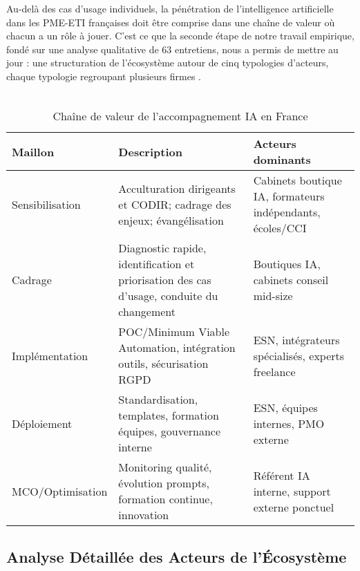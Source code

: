 Au-delà des cas d'usage individuels, la pénétration de l'intelligence artificielle dans les PME-ETI françaises doit être comprise dans une chaîne de valeur où chacun a un rôle à jouer. C'est ce que la seconde étape de notre travail empirique, fondé sur une analyse qualitative de 63 entretiens, nous a permis de mettre au jour : une structuration de l'écosystème autour de cinq typologies d'acteurs, chaque typologie regroupant plusieurs firmes \cite{moore1996death}.
\\\\
\begin{table}[ht]
\centering
\caption{Chaîne de valeur de l'accompagnement IA en France}
\label{tab:value_chain}
\begin{tabular}{@{}p{3.5cm}p{6.5cm}p{5cm}@{}}
\toprule
\textbf{Maillon} & \textbf{Description} & \textbf{Acteurs dominants} \\
\midrule
Sensibilisation & Acculturation dirigeants et CODIR; cadrage des enjeux; évangélisation & Cabinets boutique IA, formateurs indépendants, écoles/CCI \\
Cadrage & Diagnostic rapide, identification et priorisation des cas d'usage, conduite du changement & Boutiques IA, cabinets conseil mid-size \\
Implémentation & POC/Minimum Viable Automation, intégration outils, sécurisation RGPD & ESN, intégrateurs spécialisés, experts freelance \\
Déploiement & Standardisation, templates, formation équipes, gouvernance interne & ESN, équipes internes, PMO externe \\
MCO/Optimisation & Monitoring qualité, évolution prompts, formation continue, innovation & Référent IA interne, support externe ponctuel \\
\bottomrule
\end{tabular}
\end{table}

\subsection{Analyse Détaillée des Acteurs de l'Écosystème}

